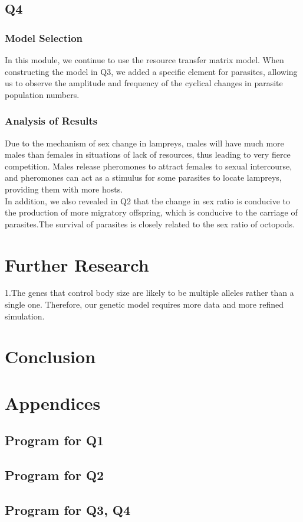 \documentclass[12pt]{article}
\begin{document}
\subsection{Q4}
\subsubsection{Model Selection}
In this module, we continue to use the resource transfer matrix model. When constructing the model 
in Q3, we added a specific element for parasites, allowing us to observe the amplitude and frequency 
of the cyclical changes in parasite population numbers. 
\subsubsection{Analysis of Results}
Due to the mechanism of sex change in lampreys, males will have much more males than females in 
situations of lack of resources, thus leading to very fierce competition. Males release pheromones 
to attract females to sexual intercourse, and pheromones can act as a stimulus for some parasites 
to locate lampreys, providing them with more hosts.\\
In addition, we also revealed in Q2 that the change in sex ratio is conducive to the production 
of more migratory offspring, which is conducive to the carriage of parasites.The survival of 
parasites is closely related to the sex ratio of octopods. 
\section{Further Research}
1.The genes that control body size are likely to be multiple alleles rather than a single one.
Therefore, our genetic model requires more data and more refined simulation.
\section{Conclusion}
\newpage
\newpage
\listoffigures
\listoftables


\newpage
\section*{Appendices}
\subsection*{Program for Q1}


\subsection*{Program for Q2}



\subsection*{Program for Q3, Q4}

\end{document}
